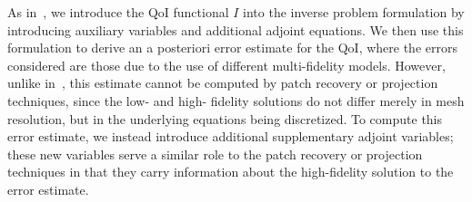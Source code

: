 \documentclass[review,sort&compress]{elsarticle}
\begin{document}
As in~\cite{BecVex05}, we introduce the QoI functional $I$ into the inverse problem formulation by introducing auxiliary variables and additional adjoint equations. We then use this formulation to derive an a posteriori error estimate for the QoI, where the errors considered are those due to the use of different multi-fidelity models. However, unlike in~\cite{BecVex05}, this estimate cannot be computed by patch recovery or projection techniques, since the low- and high- fidelity solutions do not differ merely in mesh resolution, but in the underlying equations being discretized. To compute this error estimate, we instead introduce additional supplementary adjoint variables; these new variables serve a similar role to the patch recovery or projection techniques in that they carry information about the high-fidelity solution to the error estimate.

%
\end{document}
